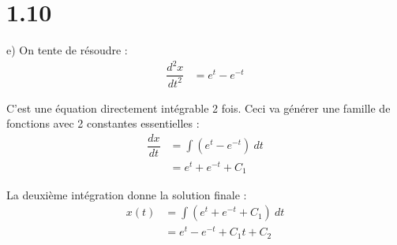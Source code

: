 \section*{1.10}

e) On tente de résoudre :
\begin{align*}
    \dfrac{d^2x}{dt^2} &= e^t - e^{-t}
\end{align*}

C'est une équation directement intégrable 2 fois. Ceci va générer une famille
de fonctions avec 2 constantes essentielles :
\begin{align*}
    \dfrac{dx}{dt} &= \int{\left(e^t - e^{-t}\right)\ dt} \\
    &= e^t +e^{-t} + C_1
\end{align*}

La deuxième intégration donne la solution finale :
\begin{align*}
    x(t) &= \int{\left(e^t + e^{-t} + C_1\right)\ dt} \\
    &= e^t -e^{-t} + C_1t + C_2
\end{align*}
